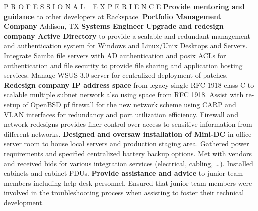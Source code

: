 \begin{rubric}{P R O F E S S I O N A L ~ E X P E R I E N C E}
        \entry*\textbf{Provide mentoring and guidance} to other developers at Rackspace.
		\entry*\textbf{Portfolio Management Company} Addison, TX
			\textbf{Systems Engineer}
		\entry*\textbf{Upgrade and redesign company Active Directory} to provide a scalable and redundant management and authentication system for Windows and Linux/Unix Desktops and Servers.  Integrate Samba file servers with AD authentication and posix ACLs for authentication and file security to provide file sharing and application hosting services.  Manage WSUS 3.0 server for centralized deployment of patches.
		\entry*\textbf{Redesign company IP address space} from legacy single RFC 1918 class C to scalable multiple subnet network also using space from RFC 1918.  Assist with re-setup of OpenBSD pf firewall for the new network scheme using CARP and VLAN interfaces for redundancy and port utilization efficiency.  Firewall and network redesigns provides finer control over access to sensitive information from different networks.
		\entry*\textbf{Designed and oversaw installation of Mini-DC} in office server room to house local servers and production staging area.  Gathered power requirements and specified centralized battery backup options.  Met with vendors and received bids for various integration services (electrical, cabling, \ldots).  Installed cabinets and cabinet PDUs.
		\entry*\textbf{Provide assistance and advice} to junior team members including help desk personnel.  Ensured that junior team members were involved in the troubleshooting process when assisting to foster their technical development.
		

\end{rubric}
